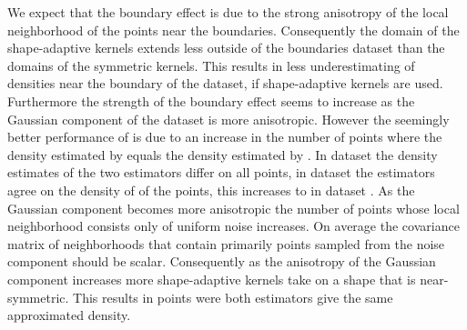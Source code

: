 			We expect that the boundary effect is due to the strong anisotropy of the local neighborhood of the points near the boundaries. Consequently the domain of the shape-adaptive kernels extends less outside of the boundaries dataset than the domains of the symmetric kernels. This results in less underestimating of densities near the boundary of the dataset, if shape-adaptive kernels are used.
			Furthermore the strength of the boundary effect seems to increase as the Gaussian component of the dataset is more anisotropic. However the seemingly better performance of \sambe is due to an increase in the number of points where the density estimated by \sambe equals the density estimated by \mbe. In dataset \ferdosiOne the density estimates of the two estimators differ on all points, in dataset \baakmanOne the estimators agree on the density of  of the points, this increases to  in dataset \baakmanFive.
			As the Gaussian component becomes more anisotropic the number of points whose local neighborhood consists only of uniform noise increases. On average the covariance matrix of neighborhoods that contain primarily points sampled from the noise component should be scalar. Consequently as the anisotropy of the Gaussian component increases more shape-adaptive kernels take on a shape that is near-symmetric. This results in points were both estimators give the same approximated density. 
	
